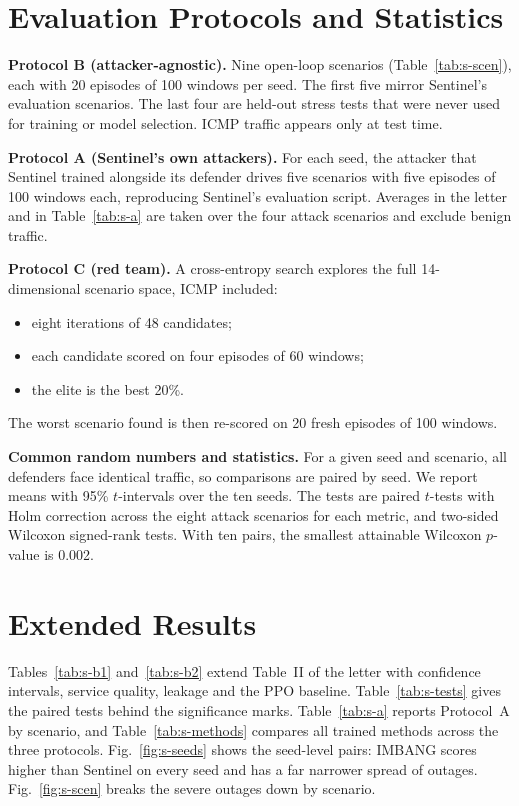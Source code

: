 \documentclass[10pt,journal,onecolumn]{IEEEtran}
\begin{document}
\section{Evaluation Protocols and Statistics}
\label{sec:s-eval}
\textbf{Protocol B (attacker-agnostic).} Nine open-loop scenarios (Table~\ref{tab:s-scen}), each with 20 episodes of 100 windows per seed. The first five mirror Sentinel's evaluation scenarios. The last four are held-out stress tests that were never used for training or model selection. ICMP traffic appears only at test time.

\textbf{Protocol A (Sentinel's own attackers).} For each seed, the attacker that Sentinel trained alongside its defender drives five scenarios with five episodes of 100 windows each, reproducing Sentinel's evaluation script. Averages in the letter and in Table~\ref{tab:s-a} are taken over the four attack scenarios and exclude benign traffic.

\textbf{Protocol C (red team).} A cross-entropy search explores the full 14-dimensional scenario space, ICMP included:
\begin{itemize}
\item eight iterations of 48 candidates;
\item each candidate scored on four episodes of 60 windows;
\item the elite is the best 20\%.
\end{itemize}
The worst scenario found is then re-scored on 20 fresh episodes of 100 windows.

\textbf{Common random numbers and statistics.} For a given seed and scenario, all defenders face identical traffic, so comparisons are paired by seed. We report means with 95\% $t$-intervals over the ten seeds. The tests are paired $t$-tests with Holm correction across the eight attack scenarios for each metric, and two-sided Wilcoxon signed-rank tests. With ten pairs, the smallest attainable Wilcoxon $p$-value is 0.002.



\section{Extended Results}
\label{sec:s-results}
Tables~\ref{tab:s-b1} and~\ref{tab:s-b2} extend Table~II of the letter with confidence intervals, service quality, leakage and the PPO baseline. Table~\ref{tab:s-tests} gives the paired tests behind the significance marks. Table~\ref{tab:s-a} reports Protocol~A by scenario, and Table~\ref{tab:s-methods} compares all trained methods across the three protocols. Fig.~\ref{fig:s-seeds} shows the seed-level pairs: IMBANG scores higher than Sentinel on every seed and has a far narrower spread of outages. Fig.~\ref{fig:s-scen} breaks the severe outages down by scenario.
\end{document}
